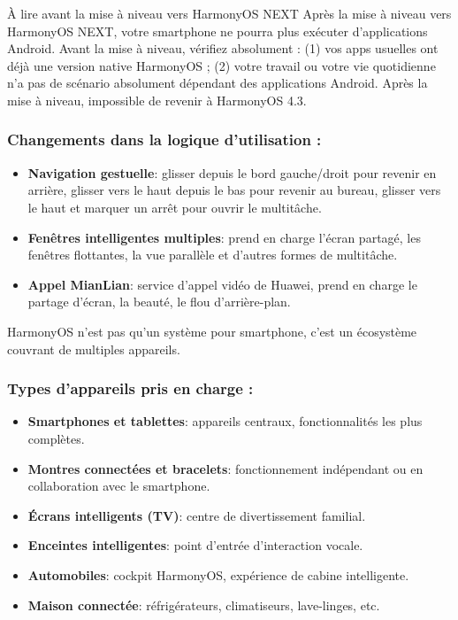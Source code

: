 \begin{tcbwarn}{À lire avant la mise à niveau vers HarmonyOS NEXT}
Après la mise à niveau vers HarmonyOS NEXT, votre smartphone ne pourra plus exécuter d'applications Android. Avant la mise à niveau, vérifiez absolument : (1) vos apps usuelles ont déjà une version native HarmonyOS ; (2) votre travail ou votre vie quotidienne n'a pas de scénario absolument dépendant des applications Android. Après la mise à niveau, impossible de revenir à HarmonyOS 4.3.

\end{tcbwarn}

\subsubsection*{Changements dans la logique d'utilisation :}

\begin{itemize}
  \item \textbf{Navigation gestuelle}: glisser depuis le bord gauche/droit pour revenir en arrière, glisser vers le haut depuis le bas pour revenir au bureau, glisser vers le haut et marquer un arrêt pour ouvrir le multitâche.
  \item \textbf{Fenêtres intelligentes multiples}: prend en charge l'écran partagé, les fenêtres flottantes, la vue parallèle et d'autres formes de multitâche.
  \item \textbf{Appel MianLian}: service d'appel vidéo de Huawei, prend en charge le partage d'écran, la beauté, le flou d'arrière-plan.
\end{itemize}


HarmonyOS n'est pas qu'un système pour smartphone, c'est un écosystème couvrant de multiples appareils.

\subsubsection*{Types d'appareils pris en charge :}

\begin{itemize}
  \item \textbf{Smartphones et tablettes}: appareils centraux, fonctionnalités les plus complètes.
  \item \textbf{Montres connectées et bracelets}: fonctionnement indépendant ou en collaboration avec le smartphone.
  \item \textbf{Écrans intelligents (TV)}: centre de divertissement familial.
  \item \textbf{Enceintes intelligentes}: point d'entrée d'interaction vocale.
  \item \textbf{Automobiles}: cockpit HarmonyOS, expérience de cabine intelligente.
  \item \textbf{Maison connectée}: réfrigérateurs, climatiseurs, lave-linges, etc.
\end{itemize}

